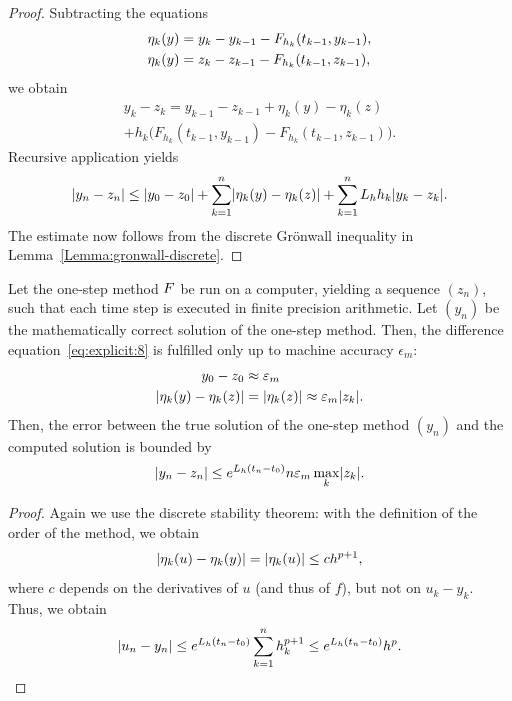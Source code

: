 

\begin{proof}
  Subtracting the equations
  \begin{align*}
    \eta_k(y) &= y_k-y_{k-1} - F_{h_k}(t_{k-1},y_{k-1}),
    \\
    \eta_k(y) &= z_k-z_{k-1} - F_{h_k}(t_{k-1},z_{k-1}),
  \end{align*}
  we obtain
  \begin{multline*}
    y_k-z_k = y_{k-1} - z_{k-1} + \eta_k(y) - \eta_k(z)
    \\
    + h_k \bigl(
      F_{h_k}(t_{k-1},y_{k-1})-F_{h_k}(t_{k-1},z_{k-1})
    \bigr)
    .
  \end{multline*}
  Recursive application yields
  \begin{gather*}
    \lvert y_n-z_n\rvert \le \lvert y_0-z_0\rvert
    + \sum_{k=1}^n \lvert\eta_k(y)-\eta_k(z)\rvert
    + \sum_{k=1}^n L_h h_{k} \lvert y_k-z_k\rvert.
  \end{gather*}
  The estimate now follows from the discrete Grönwall inequality in
  Lemma~\ref{Lemma:gronwall-discrete}.
\end{proof}

\begin{corollary}
  Let the one-step method $F$ be run on a computer, yielding
  a sequence $(z_n)$, such that each time step is executed in finite
  precision arithmetic. Let $(y_n)$ be the mathematically correct
  solution of the one-step method. Then, the difference
  equation~\eqref{eq:explicit:8} is fulfilled only up to machine
  accuracy $\epsilon_m$:
  \begin{align*}
    y_0-z_0 &\approx \varepsilon_m \\
    \lvert\eta_k(y) - \eta_k(z)\rvert &= \lvert\eta_k(z)\rvert \approx \varepsilon_m \lvert z_k\rvert.
  \end{align*}
  Then, the error between the true solution of the one-step method
  $(y_n)$ and the computed solution is bounded by
  \begin{gather*}
    \lvert y_n-z_n\rvert \le e^{L_h(t_n-t_0)} n \varepsilon_m \max_k\lvert z_k\rvert.
  \end{gather*}
\end{corollary}



\begin{proof}
  Again we use the discrete stability theorem: with the definition of
  the order of the method, we obtain
  \begin{gather*}
    \lvert\eta_k(u)-\eta_k(y)\rvert = \lvert\eta_k(u)\rvert \le c h^{p+1},
  \end{gather*}
  where $c$ depends on the derivatives of $u$ (and thus of $f$), but
  not on $u_k-y_k$. Thus, we obtain
  \begin{gather*}
    \lvert u_n-y_n\rvert \le e^{L_h(t_n-t_0)}\sum_{k=1}^n h_k^{p+1}
    \le e^{L_h(t_n-t_0)} h^p.
  \end{gather*}
\end{proof}

